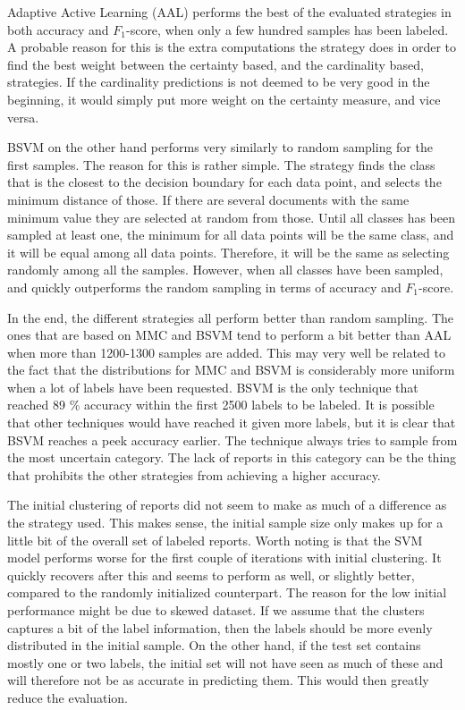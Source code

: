 Adaptive Active Learning (AAL) performs the best of the evaluated strategies in both accuracy and $F_1$-score, when only a few hundred samples has been labeled. 
A probable reason for this is the extra computations the strategy does in order to find the best weight between the certainty based, and the cardinality based, strategies.
If the cardinality predictions is not deemed to be very good in the beginning, it would simply put more weight on the certainty measure, and vice versa.

BSVM on the other hand performs very similarly to random sampling for the first samples.
The reason for this is rather simple.
The strategy finds the class that is the closest to the decision boundary for each data point, and selects the minimum distance of those.
If there are several documents with the same minimum value they are selected at random from those.
Until all classes has been sampled at least one, the minimum for all data points will be the same class, and it will be equal among all data points.
Therefore, it will be the same as selecting randomly among all the samples.
However, when all classes have been sampled, and quickly outperforms the random sampling in terms of accuracy and $F_1$-score.

In the end, the different strategies all perform better than random sampling.
The ones that are based on MMC and BSVM tend to perform a bit better than AAL when more than 1200-1300 samples are added.
This may very well be related to the fact that the distributions for MMC and BSVM is considerably more uniform when a lot of labels have been requested.
BSVM is the only technique that reached 89 \% accuracy within the first 2500 labels to be labeled.
It is possible that other techniques would have reached it given more labels, but it is clear that BSVM reaches a peek accuracy earlier.
The technique always tries to sample from the most uncertain category.
The lack of reports in this category can be the thing that prohibits the other strategies from achieving a higher accuracy.

The initial clustering of reports did not seem to make as much of a difference as the strategy used.
This makes sense, the initial sample size only makes up for a little bit of the overall set of labeled reports.
Worth noting is that the SVM model performs worse for the first couple of iterations with initial clustering.
It quickly recovers after this and seems to perform as well, or slightly better, compared to the randomly initialized counterpart.
The reason for the low initial performance might be due to skewed dataset.
If we assume that the clusters captures a bit of the label information, then the labels should be more evenly distributed in the initial sample.
On the other hand, if the test set contains mostly one or two labels, the initial set will not have seen as much of these and will therefore not be as accurate in predicting them.
This would then greatly reduce the evaluation.

